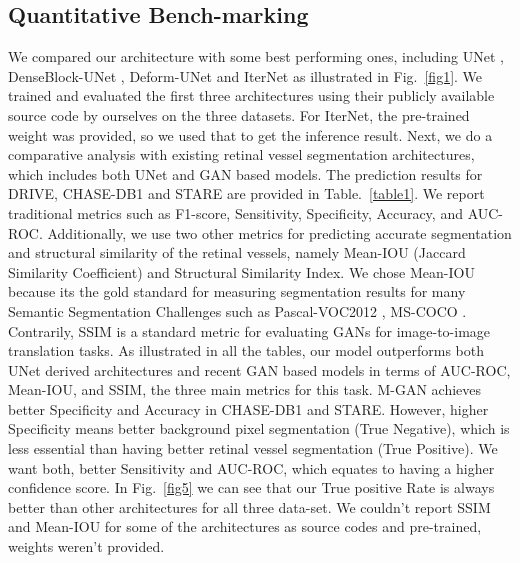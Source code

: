\documentclass[runningheads]{llncs}
\begin{document}
\subsection{Quantitative Bench-marking}
\label{subsec:quant}
We compared our architecture with some best performing ones, including UNet \cite{jin2019dunet}, DenseBlock-UNet \cite{li2018h}, Deform-UNet \cite{jin2019dunet} and IterNet \cite{li2020iternet} as illustrated in Fig.~\ref{fig1}. We trained and evaluated the first three architectures using their publicly available source code by ourselves on the three datasets. For IterNet, the pre-trained weight was provided, so we used that to get the inference result. \iffalse Receiver-operating-characteristics (ROC) curve, illustrated in Fig.~\ref{fig5}, was generated using the same weights and with a stride of 3 and image patches size of . We visualize ROC for DRIVE, CHASE-DB1 and STARE in Fig.~\ref{fig5}, where our produced ROC shows better overall performance over other architectures.\fi  Next, we do a comparative analysis with existing retinal vessel segmentation architectures, which includes both UNet and GAN based models. \iffalse such as Residual UNet \cite{alom2018recurrent}, Recurrent UNet \cite{alom2018recurrent}, R2UNet \cite{alom2018recurrent}, and SUD-GAN \cite{yang2020sud}, M-GAN \cite{park2020m}. The prediction results for DRIVE, are provided in Table.~\ref{table1}, CHASE-DB1 in Table.~\ref{table2} and STARE in Table.~\ref{table3}.\fi  The prediction results for DRIVE, CHASE-DB1 and STARE are provided in Table.~\ref{table1}. We report traditional metrics such as  F1-score, Sensitivity, Specificity, Accuracy, and AUC-ROC. Additionally, we use two other metrics for predicting accurate segmentation and structural similarity of the retinal vessels, namely Mean-IOU (Jaccard Similarity Coefficient) and Structural Similarity Index\cite{wang2004image}. We chose Mean-IOU because its the gold standard for measuring segmentation results for many Semantic Segmentation Challenges such as Pascal-VOC2012 \cite{everingham2015pascal}, MS-COCO \cite{lin2014microsoft}. Contrarily, SSIM is a standard metric for evaluating GANs for image-to-image translation tasks. As illustrated in all the tables, our model outperforms both UNet derived architectures and recent GAN based models in terms of AUC-ROC, Mean-IOU, and SSIM, the three main metrics for this task. \iffalse In Table.~\ref{table2} and Table.~\ref{table3},\fi M-GAN achieves better Specificity and Accuracy in CHASE-DB1 and STARE. However, higher Specificity means better background pixel segmentation (True Negative), which is less essential than having better retinal vessel segmentation (True Positive).  We want both, better Sensitivity and AUC-ROC, which equates to having a higher confidence score. In Fig.~\ref{fig5} we can see that our True positive Rate is always better than other architectures for all three data-set. We couldn't report SSIM and Mean-IOU for some of the architectures as source codes and pre-trained, weights weren't provided.
\end{document}
